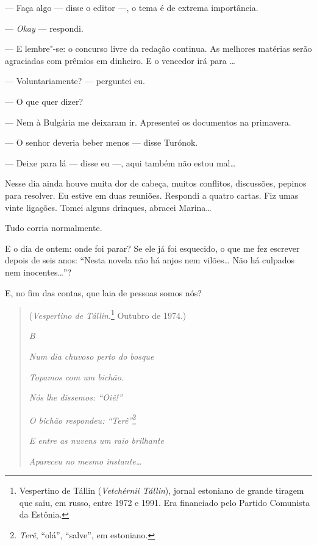 --- Faça algo --- disse o editor ---, o tema é de extrema importância.

--- \emph{Okay} --- respondi.

--- E lembre"-se: o concurso livre da redação continua. As melhores
matérias serão agraciadas com prêmios em dinheiro. E o vencedor irá para
\ldots{}

--- Voluntariamente? --- perguntei eu.

--- O que quer dizer?

--- Nem à Bulgária me deixaram ir. Apresentei os documentos na
primavera.

--- O senhor deveria beber menos --- disse Turónok.

--- Deixe para lá --- disse eu ­---, aqui também não estou mal\ldots{}

Nesse dia ainda houve muita dor de cabeça, muitos conflitos, discussões,
pepinos para resolver. Eu estive em duas reuniões. Respondi a quatro
cartas. Fiz umas vinte ligações. Tomei alguns drinques, abracei
Marina\ldots{}

Tudo corria normalmente.

E o dia de ontem: onde foi parar? Se ele já foi esquecido, o que me fez
escrever depois de seis anos: ``Nesta novela não há anjos nem vilões\ldots{}
Não há culpados nem inocentes\ldots{}''?

E, no fim das contas, que laia de pessoas somos nós?

\clearpage
\thispagestyle{empty}

\movetooddpage
\begin{center}
{}
\end{center}

\begin{quotation}
(\emph{Vespertino de Tállin}.\footnote{Vespertino de Tállin
  (\emph{Vetchérnii Tállin}), jornal estoniano de grande tiragem que
  saiu, em russo, entre 1972 e 1991. Era financiado pelo Partido
  Comunista da Estônia.} Outubro de 1974.)
\vspace{4pt}

\emph{B}

\emph{Num dia chuvoso perto do bosque}

\emph{Topamos com um bichão.}

\emph{Nós lhe dissemos: ``Oiê!''}

\emph{O bichão respondeu: ``Terê''}\footnote{\emph{Terê}, ``olá'',
  ``salve'', em estoniano.}

\emph{E entre as nuvens um raio brilhante}

\emph{Apareceu no mesmo instante\ldots{}}
\end{quotation}

